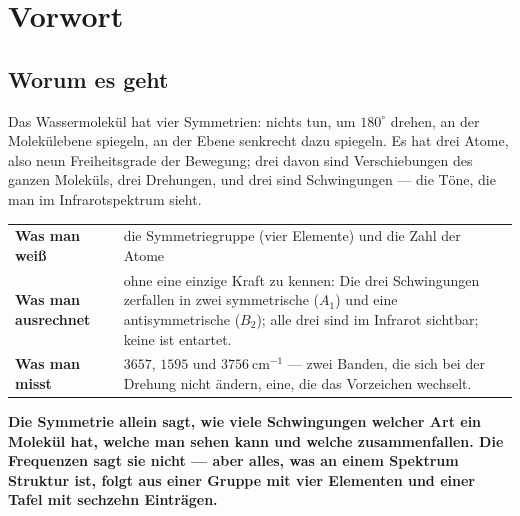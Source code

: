 \chapter*{Vorwort}

\section*{Worum es geht}

\begin{merksatz}
Das Wassermolekül hat vier Symmetrien: nichts tun, um $180^{\circ}$ drehen, an der Molekülebene spiegeln, an der Ebene senkrecht dazu spiegeln. Es hat drei Atome, also neun Freiheitsgrade der Bewegung; drei davon sind Verschiebungen des ganzen Moleküls, drei Drehungen, und drei sind Schwingungen --- die Töne, die man im Infrarotspektrum sieht.

\begin{center}
{\small
\renewcommand{\arraystretch}{1.5}
\begin{tabular}{@{}P{3.4cm}P{5.2cm}@{}}
\toprule
\textbf{Was man weiß} & die Symmetriegruppe (vier Elemente) und die Zahl der Atome\\
\textbf{Was man ausrechnet} & ohne eine einzige Kraft zu kennen: Die drei Schwingungen zerfallen in zwei symmetrische ($A_1$) und eine antisymmetrische ($B_2$); alle drei sind im Infrarot sichtbar; keine ist entartet.\\
\textbf{Was man misst} & $3657$, $1595$ und $3756\ \mathrm{cm}^{-1}$ --- zwei Banden, die sich bei der Drehung nicht ändern, eine, die das Vorzeichen wechselt.\\
\bottomrule
\end{tabular}}
\end{center}

\begin{center}
\begin{minipage}{0.9\textwidth}
\textbf{Die Symmetrie allein sagt, wie viele Schwingungen welcher Art ein Molekül hat, welche man sehen kann und welche zusammenfallen. Die Frequenzen sagt sie nicht --- aber alles, was an einem Spektrum Struktur ist, folgt aus einer Gruppe mit vier Elementen und einer Tafel mit sechzehn Einträgen.}
\end{minipage}
\end{center}


\end{merksatz}
